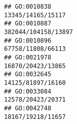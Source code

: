 \documentclass[
]{article}
\begin{document}
\begin{verbatim}
## GO:0010838                                                                                                                                                                                                                                                                                                                                                                                            13345/14165/15117
## GO:0010887                                                                                                                                                                                                                                                                                                                                                                                          382044/104158/13897
## GO:0010896                                                                                                                                                                                                                                                                                                                                                                                            67758/11808/66113
## GO:0021978                                                                                                                                                                                                                                                                                                                                                                                            16870/20423/13865
## GO:0032645                                                                                                                                                                                                                                                                                                                                                                                            14125/81897/16160
## GO:0033084                                                                                                                                                                                                                                                                                                                                                                                            12578/20423/20371
## GO:0042748                                                                                                                                                                                                                                                                                                                                                                                            18167/19218/11657

\end{verbatim}
\end{document}
